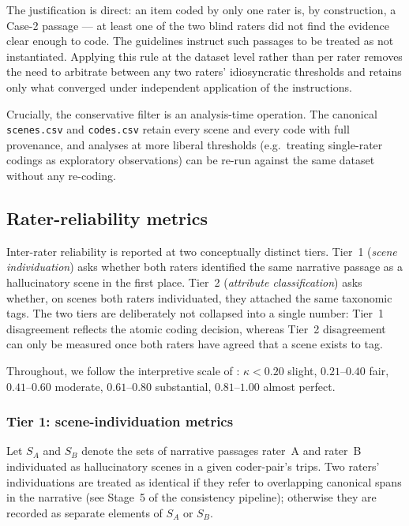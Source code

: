 The justification is direct: an item coded by only one rater is, by construction, a Case-2 passage --- at least one of the two blind raters did not find the evidence clear enough to code. The guidelines instruct such passages to be treated as not instantiated. Applying this rule at the dataset level rather than per rater removes the need to arbitrate between any two raters' idiosyncratic thresholds and retains only what converged under independent application of the instructions.

Crucially, the conservative filter is an analysis-time operation. The canonical \texttt{scenes.csv} and \texttt{codes.csv} retain every scene and every code with full provenance, and analyses at more liberal thresholds (e.g.\ treating single-rater codings as exploratory observations) can be re-run against the same dataset without any re-coding.

\subsection{Rater-reliability metrics}
\label{sec:diagnostics}

Inter-rater reliability is reported at two conceptually distinct tiers. Tier~1 (\emph{scene individuation}) asks whether both raters identified the same narrative passage as a hallucinatory scene in the first place. Tier~2 (\emph{attribute classification}) asks whether, on scenes both raters individuated, they attached the same taxonomic tags. The two tiers are deliberately not collapsed into a single number: Tier~1 disagreement reflects the atomic coding decision, whereas Tier~2 disagreement can only be measured once both raters have agreed that a scene exists to tag.

Throughout, we follow the interpretive scale of \citet{landis1977}: $\kappa<0.20$ slight, $0.21$--$0.40$ fair, $0.41$--$0.60$ moderate, $0.61$--$0.80$ substantial, $0.81$--$1.00$ almost perfect.

\subsubsection*{Tier 1: scene-individuation metrics}
Let $S_A$ and $S_B$ denote the sets of narrative passages rater~A and rater~B individuated as hallucinatory scenes in a given coder-pair's trips. Two raters' individuations are treated as identical if they refer to overlapping canonical spans in the narrative (see Stage~5 of the consistency pipeline); otherwise they are recorded as separate elements of $S_A$ or $S_B$.


